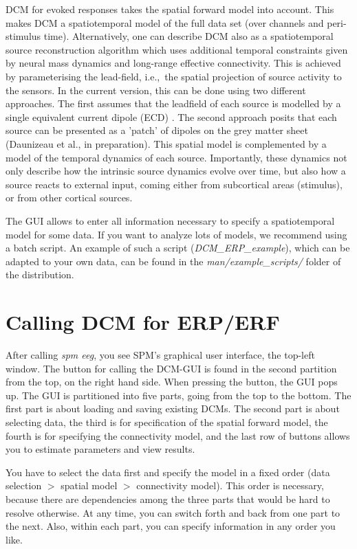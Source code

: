 DCM for evoked responses takes the spatial forward model into
account. This makes DCM a spatiotemporal model of the full data set
(over channels and peri-stimulus time). Alternatively, one can
describe DCM also as a spatiotemporal source reconstruction algorithm which uses
additional temporal constraints given by neural mass dynamics and
long-range effective connectivity. This is achieved by parameterising
the lead-field, i.e.,~the spatial projection of source 
activity to the sensors. In the current version, this can be done
using two different approaches. The first assumes that the leadfield
of each source is modelled by a single equivalent current dipole 
(ECD) \cite{sjk_dcm_erp}. The second approach posits that each source
can be presented as a 'patch' of dipoles on the grey matter sheet
(Daunizeau et al., in preparation). This spatial model is complemented
by a model of the temporal dynamics of each source. Importantly, these
dynamics not only describe how the intrinsic source dynamics evolve
over time, but also how a source reacts to external input, coming
either from subcortical areas (stimulus), or from other cortical
sources.

The GUI allows to enter all information necessary to specify a
spatiotemporal model for some data. If you want to analyze lots of
models, we recommend using a batch script. An example of such 
a script (\textit{DCM\_ERP\_example}), which can be adapted to your
own data, can be found in the \textit{man/example\_scripts/} folder of
the distribution.

\section{Calling DCM for ERP/ERF}
After calling \textit{spm eeg}, you see SPM's graphical user interface,
the top-left window. The button for calling the DCM-GUI is found
in the second partition from the top, on the right hand side. When
pressing the button, the GUI pops up. The GUI is partitioned into five 
parts, going from the top to the bottom. The first part is about
loading and saving existing DCMs. The second part is about selecting
data, the third is for specification of the spatial forward model, the
fourth is for specifying the connectivity model, and the last row of
buttons allows you to estimate parameters and view results.

You have to select the data first and specify the model in
a fixed order (data selection $>$ spatial model $>$
connectivity model). This order is necessary, because there are
dependencies among the three parts that would be hard to resolve
otherwise. At any time, you can switch forth and back from one part to
the next. Also, within each part, you can specify information in any
order you like.  

